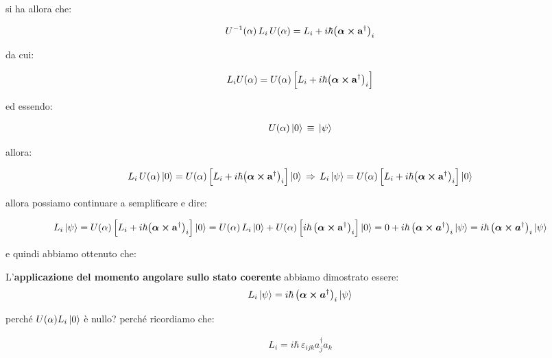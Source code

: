 	si ha allora che:
	
\begin{align*}
	 U^{-1}(\alpha) \, L_i \, U(\alpha)  = L_i + i \hbar \qty(\vb*{\alpha} \cp \vb{a}^{\dagger})_i
\end{align*}

	da cui:

\begin{align*}
	L_i U(\alpha) = U(\alpha) \, \qty\Big[L_i  + i \hbar \qty(\vb*{\alpha} \cp \vb{a}^{\dagger})_i]
\end{align*}

	ed essendo:
	
\begin{align*}
	U(\alpha)\ket{0} \, \equiv \, \ket{\psi}
\end{align*}

	allora:
	
\begin{align*}
	L_i \, U(\alpha) \ket{0} = U(\alpha) \, \qty\Big[L_i  + i \hbar \qty(\vb*{\alpha} \cp \vb{a}^{\dagger})_i] \ket{0} \, \Rightarrow \, L_i \ket{\psi} = U(\alpha) \, \qty\Big[L_i  + i \hbar \qty(\vb*{\alpha} \cp \vb{a}^{\dagger})_i] \ket{0} 
\end{align*}

	allora possiamo continuare a semplificare e dire:
	
\begin{align*}
	 L_i \ket{\psi} = U(\alpha) \, \qty\Big[L_i  + i \hbar \qty(\vb*{\alpha} \cp \vb{a}^{\dagger})_i] \ket{0} = U(\alpha) \, L_i \ket{0} + U(\alpha) \, \qty\Big[  i\hbar \, \qty(\vb*{\alpha} \cp \vb{a}^{\dagger})_i ] \ket{0} =  0 + i \hbar \, \qty(\vb*{\alpha} \cp \vb*{a}^{\dagger})_i \ket{\psi} = i \hbar \, \qty(\vb*{\alpha} \cp \vb*{a}^{\dagger})_i \ket{\psi}
\end{align*}

	e quindi abbiamo ottenuto che:
	
\begin{mydef}
	L'\textbf{applicazione del momento angolare sullo stato coerente} abbiamo dimostrato essere: 
\begin{align*}
	 L_i \ket{\psi} = i \hbar \, \qty(\vb*{\alpha} \cp \vb*{a}^{\dagger})_i \ket{\psi}
\end{align*}
\end{mydef}

	perché $U(\alpha) L_i \ket{0}$ è nullo? perché ricordiamo che:

\begin{nb}
\begin{align*}
	L_i = i \hbar \, \varepsilon_{ijk} a_j^{\dagger} a_k
\end{align*}
\end{nb}
	
